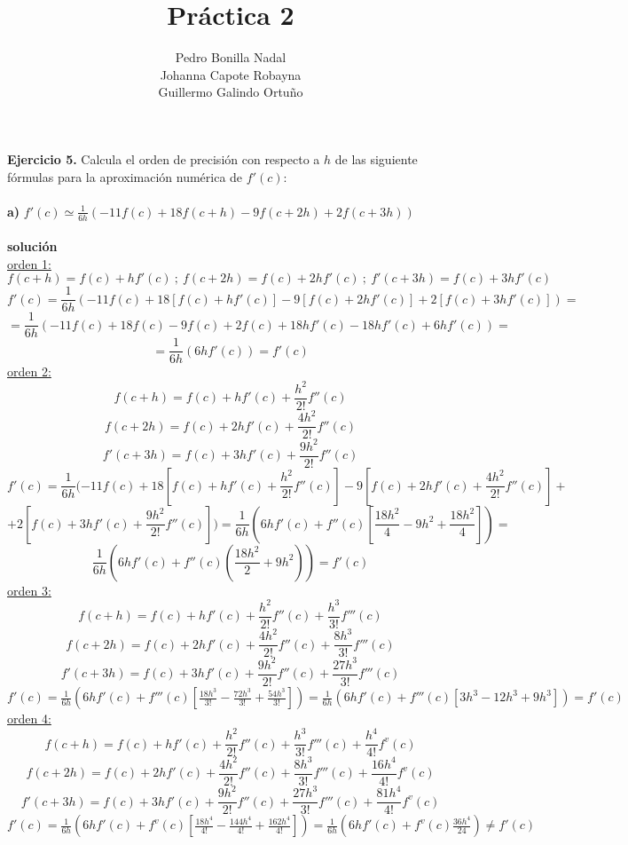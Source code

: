 \documentclass[11pt]{article}
\title{\textbf{Práctica 2}}
\author{Pedro Bonilla Nadal\\
		Johanna Capote Robayna\\
		Guillermo Galindo Ortuño}
\date{}
\begin{document}
\maketitle

\textbf{Ejercicio 5.} Calcula el orden de precisión con respecto a $h$ de las siguiente fórmulas para la aproximación numérica de $f'(c)$: \\ \\

\textbf{a)} $f'(c) \simeq \frac{1}{6h}(-11f(c) + 18f(c + h) -9f(c + 2h) +2f(c+3h))$ \\ \\
\textbf{solución} \\
\underline{orden 1:} \\
$$f(c + h) = f(c) + hf'(c) \ ; \ f(c + 2h) = f(c) + 2hf'(c) \ ; \ f'(c + 3h) = f(c) + 3hf'(c)$$
$$f'(c) = \frac{1}{6h}(-11f(c) + 18  [f(c) + hf'(c)] - 9  [f(c) + 2hf'(c)] + 2 [f(c) + 3hf'(c)]) = $$
$$= \frac{1}{6h}(-11f(c) + 18f(c) - 9f(c) + 2f(c) + 18hf'(c) - 18hf'(c) + 6hf'(c)) = $$
$$= \frac{1}{6h}(6hf'(c)) = f'(c) $$
\underline{orden 2:} \\
$$ f(c + h) = f(c) + hf'(c) + \frac{h^{2}}{2!} f''(c)$$ $$ f(c + 2h) = f(c) + 2hf'(c) + \frac{4h^{2}}{2!} f''(c)$$ $$f'(c + 3h) = f(c) + 3hf'(c) + \frac{9h^{2}}{2!} f''(c) $$
$$f'(c) = \frac{1}{6h}(-11f(c) + 18  [f(c) + hf'(c) + \frac{h^{2}}{2!} f''(c)] - 9  [f(c) + 2hf'(c) + \frac{4h^{2}}{2!} f''(c)] +$$ $$ + 2 [f(c) + 3hf'(c) + \frac{9h^{2}}{2!} f''(c)]) = \frac{1}{6h}(6hf'(c) + f''(c)[\frac{18h^{2}}{4} - 9h^{2} + \frac{18h^{2}}{4}]) = $$ $$\frac{1}{6h}(6hf'(c) + f''(c)(\frac{18h^{2}}{2} + 9h^{2})) = f'(c)$$
\underline{orden 3:} \\
$$ f(c + h) = f(c) + hf'(c) + \frac{h^{2}}{2!} f''(c) + \frac{h^{3}}{3!}f'''(c)$$
$$ f(c + 2h) = f(c) + 2hf'(c) + \frac{4h^{2}}{2!} f''(c) + \frac{8h^{3}}{3!}f'''(c)$$ 
$$f'(c + 3h) = f(c) + 3hf'(c) + \frac{9h^{2}}{2!} f''(c) + \frac{27h^{3}}{3!}f'''(c)$$
$f'(c) = \frac{1}{6h}(6hf'(c) + f'''(c)[\frac{18h^{3}}{3!} - \frac{72h^{3}}{3!} + \frac{54h^{3}}{3!}]) =  \frac{1}{6h}(6hf'(c) + f'''(c)[3h^{3} - 12h^{3} + 9h^{3}]) = f'(c)  $ \\
\underline{orden 4:} \\
$$ f(c + h) = f(c) + hf'(c) + \frac{h^{2}}{2!} f''(c) + \frac{h^{3}}{3!}f'''(c) + \frac{h^{4}}{4!}f^{v}(c)$$
$$ f(c + 2h) = f(c) + 2hf'(c) + \frac{4h^{2}}{2!} f''(c) + \frac{8h^{3}}{3!}f'''(c) + \frac{16h^{4}}{4!}f^{v}(c)$$ 
$$f'(c + 3h) = f(c) + 3hf'(c) + \frac{9h^{2}}{2!} f''(c) + \frac{27h^{3}}{3!}f'''(c) + \frac{81h^{4}}{4!}f^{v}(c)$$
$f'(c) = \frac{1}{6h}(6hf'(c) + f^{v}(c)[\frac{18h^{4}}{4!} - \frac{144h^{4}}{4!} + \frac{162h^{4}}{4!}]) = \frac{1}{6h}(6hf'(c) + f^{v}(c)\frac{36h^{4}}{24}) \neq f'(c) $ \\
\end{document}
